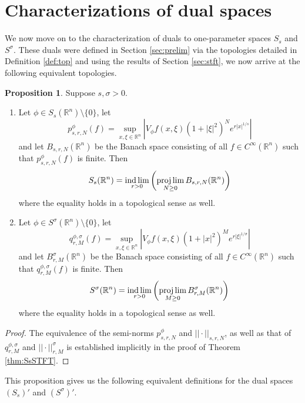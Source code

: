\documentclass[11pt,a4paper,reqno]{amsart}
\numberwithin{equation}{section}
\theoremstyle{definition}
\newtheorem{prop}[thm]{Proposition}
\theoremstyle{definition}
\DeclareMathOperator*{\indlim}{ind\,lim}
\begin{document}
\section{Characterizations of dual spaces}\label{sec:dual}
We now move on to the characterization of duals to one-parameter spaces $S_s$ and $S^\sigma$. These duals were defined in Section \ref{sec:prelim} via the topologies detailed in Definition \ref{def:top} and using the results of Section \ref{sec:stft}, we now arrive at the following equivalent topologies. 
\begin{prop}
Suppose $s,\sigma > 0$.
\begin{enumerate}[label=(\roman*)]
    \item Let $\phi\in S_s(\mathbb{R}^n)\setminus\{0\}$, let
    \begin{equation*}
        p^{\phi}_{s,r,N}(f) = \sup_{x,\xi\in\mathbb{R}^n} \left| V_\phi f(x,\xi) (1+|\xi|^2)^{N}e^{r |x|^{1/s}}\right|
    \end{equation*}
    and let $B_{s,r,N}(\mathbb{R}^{n})$ be the Banach space consisting of all $f\in C^\infty(\mathbb{R}^{n})$ such that $p^{\phi}_{s,r,N}(f)$ is finite. Then 
    $$ S_s(\mathbb{R}^n) = \indlim_{r>0}\left(\projlim_{N\geq 0} B_{s,r,N}(\mathbb{R}^{n}) \right) $$
    where the equality holds in a topological sense as well. 
    \item Let $\phi\in S^\sigma(\mathbb{R}^n)\setminus\{0\}$, let
    \begin{equation*}
        q^{\phi,\sigma}_{r,M}(f) = \sup_{x,\xi\in\mathbb{R}^n} \left| V_\phi f(x,\xi) (1+|x|^2)^{M}e^{r |\xi|^{1/\sigma}}\right|
    \end{equation*}
    and let $B^\sigma_{r,M}(\mathbb{R}^{n})$ be the Banach space consisting of all $f\in C^\infty(\mathbb{R}^{n})$ such that $q^{\phi,\sigma}_{r,M}(f)$ is finite. Then
    $$ S^\sigma(\mathbb{R}^n) = \indlim_{r>0}\left(\projlim_{M\geq 0} B^\sigma_{r,M}(\mathbb{R}^{n}) \right) $$
    where the equality holds in a topological sense as well. 
\end{enumerate}
\end{prop}
\begin{proof}
The equivalence of the semi-norms $p^{\phi}_{s,r,N}$ and $||\cdot||_{s,r,N}$, as well as that of $q^{\phi,\sigma}_{r,M}$ and $||\cdot||^\sigma_{r,M}$ is established implicitly in the proof of Theorem \ref{thm:SsSTFT}.
\end{proof}
This proposition gives us the following equivalent definitions for the dual spaces $(S_s)'$ and $(S^\sigma)'$.
\end{document}
